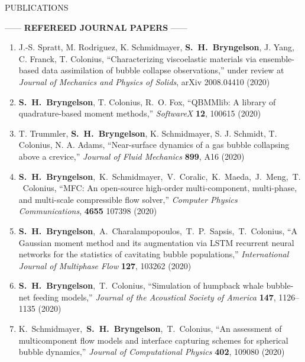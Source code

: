 \documentclass{resume} %
\makeatletter
\newlength{\bibhang}
\newlength{\bibsep}
\newenvironment{bibsection}%
        {\begin{enumerate}{}{%
       \setlength{\leftmargin}{\bibhang}%
       \setlength{\itemindent}{-\leftmargin}%
       \setlength{\itemsep}{\bibsep}%
       \setlength{\parsep}{\z@}%
        \setlength{\topsep}{0pt}}}
        {\end{enumerate}\vspace{-.1\baselineskip}}
\newcommand\SHB{\mbox{\textbf{S. H. Bryngelson}}}
\newcommand\SpencerTim{\mbox{\textbf{S. H. Bryngelson}, T. Colonius}}
\newcommand\KevinSpencerTim{\mbox{K. Schmidmayer, \textbf{S. H. Bryngelson}, T. Colonius}}
\newcommand\SpencerThemis{\mbox{\textbf{S. H. Bryngelson}, A. Charalampopoulos, T. P. Sapsis, T. Colonius}}
\newcommand{\CPC}{Computer Physics Communications}
\newcommand{\JASA}{Journal of the Acoustical Society of America}
\newcommand{\JCP}{Journal of Computational Physics}
\newcommand{\IJMF}{International Journal of Multiphase Flow}
\newcommand{\JFM}{Journal of Fluid Mechanics}
\makeatother
\begin{document}
\begin{rSection}{{\Large P}UBLICATIONS} %

\smallskip

\sloppy

\begin{center}
    ------ \textbf{REFEREED JOURNAL PAPERS} ------
\end{center}

\begin{bibsection}
    \setlength{\itemsep}{\bibsep}%

    \item J.-S. Spratt, M. Rodriguez, K. Schmidmayer, \SHB, J. Yang, C. Franck, T. Colonius, 
    ``Characterizing viscoelastic materials via ensemble-based data assimilation of bubble collapse observations,''
    under review at \emph{Journal of Mechanics and Physics of Solids}, arXiv 2008.04410 (2020)

    \item \SHB, T. Colonius, R.\ O. Fox, 
    ``QBMMlib: A library of quadrature-based moment methods,''
    \emph{SoftwareX} \textbf{12}, 100615 (2020)

    \item T. Trummler, \SHB, K. Schmidmayer, S. J. Schmidt, T. Colonius, N. A. Adams,
    ``Near\hyp{}surface dynamics of a gas bubble collapsing above a crevice,''
	\emph{\JFM} \textbf{899}, A16 (2020) 

    \item \mbox{\textbf{S. H. Bryngelson}, K. Schmidmayer, V. Coralic, K. Maeda, J. Meng, T. Colonius}, 
    ``MFC: An open\hyp{}source high\hyp{}order multi-component, multi-phase, and multi-scale compressible flow solver,''
    \emph{\CPC}, \textbf{4655} 107398 (2020)

    \item \SpencerThemis,
	``A Gaussian moment method and its augmentation via LSTM recurrent neural networks for the statistics of cavitating bubble populations,''
    \emph{\IJMF} \textbf{127}, 103262 (2020)

	\item \SpencerTim, 
	``Simulation of humpback whale bubble-net feeding models,'' 
    \emph{\JASA} \textbf{147}, 1126--1135 (2020) 	

	\item \KevinSpencerTim, 
	``An assessment of multicomponent flow models and interface capturing schemes for spherical bubble dynamics,''
    \emph{\JCP} \textbf{402}, 109080 (2020) 


\end{bibsection}
\end{rSection}
\end{document}
